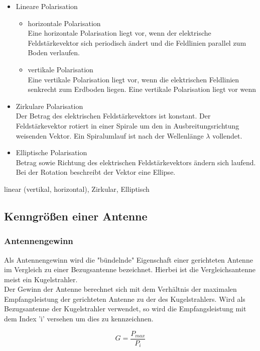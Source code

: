 \begin{itemize}
	\item Lineare Polarisation
	\begin{itemize}
		\item horizontale Polarisation\\
		Eine horizontale Polarisation liegt vor, wenn der elektrische Feldstärkevektor sich periodisch ändert und die Feldlinien parallel zum Boden verlaufen.
		\item vertikale Polarisation\\
		Eine vertikale Polarisation liegt vor, wenn die elektrischen Feldlinien senkrecht zum Erdboden liegen.
		Eine vertikale Polarisation liegt vor wenn
	\end{itemize}
	\item Zirkulare Polarisation\\
	Der Betrag des elektrischen Feldstärkevektors ist konstant. Der Feldstärkevektor rotiert in einer Spirale um den in Ausbreitungsrichtung weisenden Vektor. Ein Spiralumlauf ist nach der Wellenlänge $\lambda$ vollendet.
	\item Elliptische Polarisation\\
	Betrag sowie Richtung des elektrischen Feldstärkevektors ändern sich laufend. Bei der Rotation beschreibt der Vektor eine Ellipse.
\end{itemize}
linear (vertikal, horizontal), Zirkular, Elliptisch

\subsection{Kenngrößen einer Antenne}

\subsubsection{Antennengewinn}
Als Antennengewinn wird die "bündelnde" Eigenschaft einer gerichteten Antenne im Vergleich zu einer Bezugsantenne bezeichnet. Hierbei ist die Vergleichsantenne meist ein Kugelstrahler.\\


Der Gewinn der Antenne berechnet sich mit dem Verhältnis der maximalen Empfangsleistung der gerichteten Antenne zu der des Kugelstrahlers. Wird als Bezugsantenne der Kugelstrahler verwendet, so wird die Empfangsleistung mit dem Index 'i' versehen um dies zu kennzeichnen.

\begin{equation}
	G=\frac{P_{max}}{P_{i}}
\end{equation}

